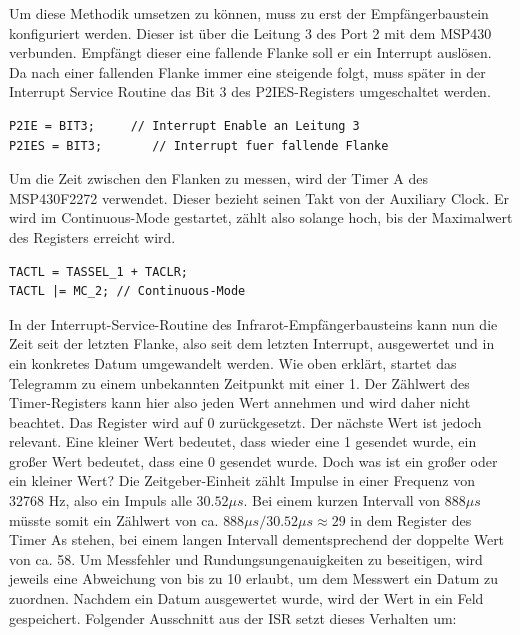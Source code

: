 \documentclass[12pt,a4paper,bibliography=totocnumbered,listof=totocnumbered]{scrartcl}
\begin{document}
Um diese Methodik umsetzen zu können, muss zu erst der Empfängerbaustein konfiguriert werden. Dieser ist über die Leitung 3 des Port 2 mit dem MSP430 verbunden. Empfängt dieser eine fallende Flanke soll er ein Interrupt auslösen. Da nach einer fallenden Flanke immer eine steigende folgt, muss später in der Interrupt Service Routine das Bit 3 des P2IES-Registers umgeschaltet werden.

\vspace{1em}
\begin{lstlisting}[caption=Konfiguration Port 2]
P2IE = BIT3;     // Interrupt Enable an Leitung 3
P2IES = BIT3;		// Interrupt fuer fallende Flanke
\end{lstlisting}

Um die Zeit zwischen den Flanken zu messen, wird der Timer A des MSP430F2272 verwendet. Dieser bezieht seinen Takt von der Auxiliary Clock. Er wird im Continuous-Mode gestartet, zählt also solange hoch, bis der Maximalwert des Registers erreicht wird.

\vspace{1em}
\begin{lstlisting}[caption=Konfiguration Timer A]
TACTL = TASSEL_1 + TACLR;
TACTL |= MC_2; // Continuous-Mode
\end{lstlisting}

In der Interrupt-Service-Routine des Infrarot-Empfängerbausteins kann nun die Zeit seit der letzten Flanke, also seit dem letzten Interrupt, ausgewertet und in ein konkretes Datum umgewandelt werden. Wie oben erklärt, startet das Telegramm zu einem unbekannten Zeitpunkt mit einer 1. Der Zählwert des Timer-Registers kann hier also jeden Wert annehmen und wird daher nicht beachtet. Das Register wird auf 0 zurückgesetzt. Der nächste Wert ist jedoch relevant. Eine kleiner Wert bedeutet, dass wieder eine 1 gesendet wurde, ein großer Wert bedeutet, dass eine 0 gesendet wurde. Doch was ist ein großer oder ein kleiner Wert? Die Zeitgeber-Einheit zählt Impulse in einer Frequenz von 32768 Hz, also ein Impuls alle \(30.52{\mu}s\). Bei einem kurzen Intervall von \(888{\mu}s\) müsste somit ein Zählwert von ca. \(888{\mu}s/30.52{\mu}s\approx29\) in dem Register des Timer As stehen, bei einem langen Intervall dementsprechend der doppelte Wert von ca. 58. Um Messfehler und Rundungsungenauigkeiten zu beseitigen, wird jeweils eine Abweichung von bis zu 10 erlaubt, um dem Messwert ein Datum zu zuordnen. Nachdem ein Datum ausgewertet wurde, wird der Wert in ein Feld gespeichert. Folgender Ausschnitt aus der ISR setzt dieses Verhalten um:
\end{document}
